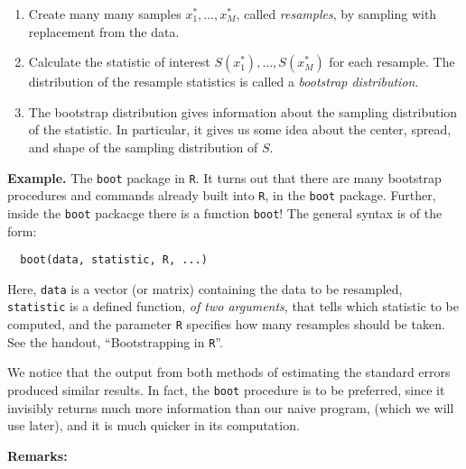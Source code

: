 \documentclass[captions=tableheading]{scrbook}
\begin{document}
\begin{enumerate}
\item Create many many samples $x_{1}^{\ast},\ldots,x_{M}^{\ast}$, called \emph{resamples}, by sampling with replacement from the data.
\item Calculate the statistic of interest $S(x_{1}^{\ast}),\ldots,S(x_{M}^{\ast})$ for each resample. The distribution of the resample statistics is called a \emph{bootstrap distribution}.
\item The bootstrap distribution gives information about the sampling distribution of the statistic. In particular, it gives us some idea about the center, spread, and shape of the sampling distribution of $S$.
\end{enumerate}












\textbf{Example.} The \texttt{boot} package in \texttt{R}. It turns out that there are many bootstrap procedures and commands already built into \texttt{R}, in the \texttt{boot} package. Further, inside the \texttt{boot} packacge there is a function \texttt{boot}! The general syntax is of the form:

\begin{verbatim}
  boot(data, statistic, R, ...)
\end{verbatim}


Here, \texttt{data} is a vector (or matrix) containing the data to be resampled, \texttt{statistic} is a defined function, \emph{of two arguments}, that tells which statistic to be computed, and the parameter \texttt{R} specifies how many resamples should be taken. See the handout, ``Bootstrapping in \texttt{R}''.

 

We notice that the output from both methods of estimating the standard errors produced similar results. In fact, the \texttt{boot} procedure is to be preferred, since it invisibly returns much more information than our naive program, (which we will use later), and it is much quicker in its computation.  


\textbf{Remarks:}
\end{document}
